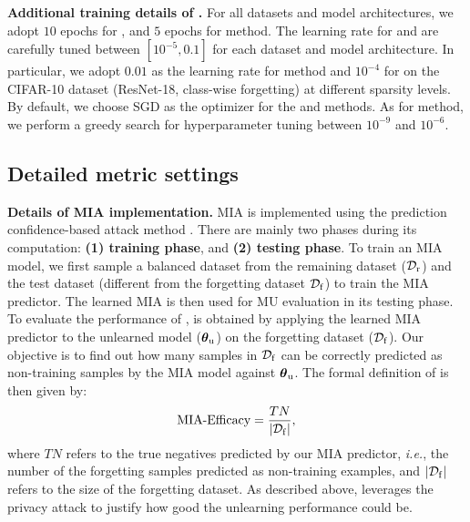 \noindent \textbf{Additional training details of {\MU}.}
For all datasets and model architectures, we adopt $10$ epochs for {\FT}, and $5$ epochs for {\GA} method. The learning rate for {\FT} and {\GA} are carefully tuned between $[10^{-5},0.1]$ for each dataset and model architecture. In particular, we adopt $0.01$ as the learning rate for {\FT} method and $10^{-4}$ for {\GA} on the CIFAR-10 dataset (ResNet-18, class-wise forgetting) at different sparsity levels.  By default, we choose SGD as the optimizer for the {\FT} and {\GA} methods. As for {\FF} method, we perform a greedy search for  hyperparameter tuning \cite{golatkar2020eternal} between $10^{-9}$ and ${10^{-6}}$. 

\subsection{Detailed metric settings}
\label{appendix: metric settings}
\noindent \textbf{Details of MIA implementation.}
MIA is implemented using the prediction confidence-based attack method \cite{song2020systematic}. There are mainly two phases during its computation: \textbf{(1) training phase}, and \textbf{(2) testing phase}.  
To train an MIA model, we first sample a balanced dataset from the remaining dataset ($\mathcal D_\mathrm{r}$) and the test dataset (different from the forgetting dataset $\mathcal D_\mathrm{f}$) to train the MIA predictor. The learned MIA is then used for MU evaluation in its testing phase. 
To evaluate the performance of {\MU}, {\MIAF} is obtained by applying the  learned MIA predictor to the unlearned model ($\boldsymbol \theta_\mathrm{u}$) on the forgetting dataset ($\mathcal D_\mathrm{f}$). Our objective is to find out how many samples in $\mathcal D_\mathrm{f}$ can be correctly predicted as non-training samples by the MIA model against $\boldsymbol \theta_\mathrm{u}$. The formal definition of {\MIAF} is then given by:
\begin{equation}
\text{{\text{MIA}-Efficacy}} = \frac{TN}{|\mathcal D_\mathrm{f}|},
\end{equation}
where $TN$ refers to the true negatives predicted by our MIA predictor, \textit{i.e.}, the number of the forgetting samples predicted as non-training examples, and $|\mathcal D_\mathrm{f}|$ refers to the size of the forgetting dataset.
As described above, {\MIAF} leverages the privacy attack to justify how good the unlearning performance could be. 


